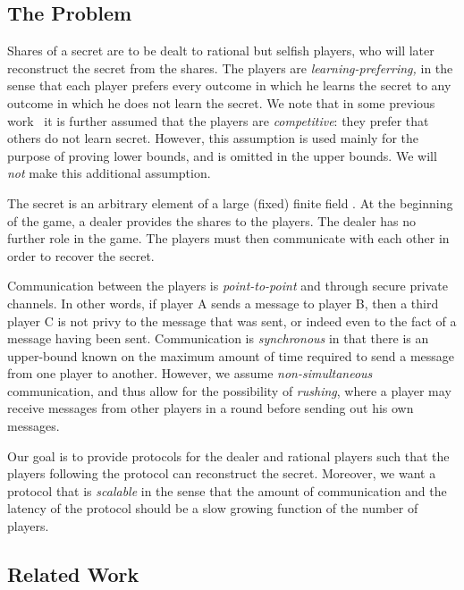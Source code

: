 \documentclass[12pt]{article}
\theoremstyle{definition}
\begin{document}
\subsection{The Problem}

Shares of a secret are to be dealt to  rational but selfish
players, who will later reconstruct the secret from the shares. The
players are \emph{learning-preferring,} in the sense that each player
prefers every outcome in which he learns the secret to any outcome in
which he does not learn the secret.  We note that in some previous
work~\cite{kol2008games,abraham2006distributed} it is further assumed
that the players are \emph{competitive}: they prefer that others do
not learn secret. However, this assumption is used mainly for the
purpose of proving lower bounds, and is omitted in the upper bounds.
We will \emph{not} make this additional assumption.

The secret is an arbitrary element of a large (fixed) finite field
.  At the beginning of the game, a dealer provides the shares to
the players.  The dealer has no further role in the game. The players
must then communicate with each other in order to recover the secret.

Communication between the players is \emph{point-to-point} and through
secure private channels. In other words, if player A sends a message
to player B, then a third player C is not privy to the message that
was sent, or indeed even to the fact of a message having been sent.
Communication is \emph{synchronous} in that there is an upper-bound
known on the maximum amount of time required to send a message from
one player to another.  However, we assume \emph{non-simultaneous}
communication, and thus allow for the possibility of \emph{rushing},
where a player may receive messages from other players in a round
before sending out his own messages.

Our goal is to provide protocols for the dealer and rational players
such that the players following the protocol can reconstruct the
secret.  Moreover, we want a protocol that is \emph{scalable} in the
sense that the amount of communication and the latency of the protocol
should be a slow growing function of the number of players.


\subsection{Related Work}
\end{document}
